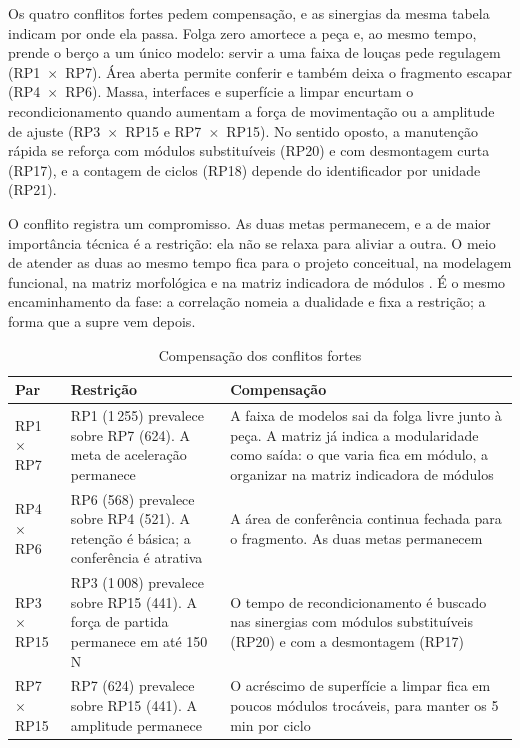 \noindent Os quatro conflitos fortes pedem compensação, e as sinergias da mesma tabela indicam por onde ela passa. Folga zero amortece a peça e, ao mesmo tempo, prende o berço a um único modelo: servir a uma faixa de louças pede regulagem (RP1~$\times$~RP7). Área aberta permite conferir e também deixa o fragmento escapar (RP4~$\times$~RP6). Massa, interfaces e superfície a limpar encurtam o recondicionamento quando aumentam a força de movimentação ou a amplitude de ajuste (RP3~$\times$~RP15 e RP7~$\times$~RP15). No sentido oposto, a manutenção rápida se reforça com módulos substituíveis (RP20) e com desmontagem curta (RP17), e a contagem de ciclos (RP18) depende do identificador por unidade (RP21).

O conflito registra um compromisso. As duas metas permanecem, e a de maior importância técnica é a restrição: ela não se relaxa para aliviar a outra. O meio de atender as duas ao mesmo tempo fica para o projeto conceitual, na modelagem funcional, na matriz morfológica e na matriz indicadora de módulos \citep{erixon1998}. É o mesmo encaminhamento da fase: a correlação nomeia a dualidade e fixa a restrição; a forma que a supre vem depois.


\begin{table}[H]
\caption{Compensação dos conflitos fortes}
\label{tab:compensacao}
\centering
\footnotesize
\begin{tabularx}{\textwidth}{@{}L{2.3cm}@{\hspace{0.25cm}}L{4.3cm}@{\hspace{0.25cm}}Y@{}}
\toprule
\textbf{Par} & \textbf{Restrição} & \textbf{Compensação} \\
\midrule
RP1 $\times$ RP7 & RP1 (1\,255) prevalece sobre RP7 (624). A meta de aceleração permanece & A faixa de modelos sai da folga livre junto à peça. A matriz já indica a modularidade como saída: o que varia fica em módulo, a organizar na matriz indicadora de módulos \\
RP4 $\times$ RP6 & RP6 (568) prevalece sobre RP4 (521). A retenção é básica; a conferência é atrativa & A área de conferência continua fechada para o fragmento. As duas metas permanecem \\
RP3 $\times$ RP15 & RP3 (1\,008) prevalece sobre RP15 (441). A força de partida permanece em até 150\,N & O tempo de recondicionamento é buscado nas sinergias com módulos substituíveis (RP20) e com a desmontagem (RP17) \\
RP7 $\times$ RP15 & RP7 (624) prevalece sobre RP15 (441). A amplitude permanece & O acréscimo de superfície a limpar fica em poucos módulos trocáveis, para manter os 5\,min por ciclo \\
\bottomrule
\end{tabularx}
\end{table}

